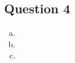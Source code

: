 \documentclass{article}
\begin{document}
\subsection*{Question 4}

\begin{enumerate}[(a)]
	\item 
	
	\item 
	
	\item 
	
\end{enumerate}

\end{document}
